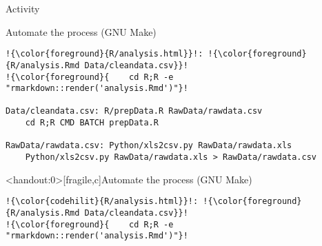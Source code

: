\documentclass[12pt,t]{beamer}
\begin{document}
{\begin{frame}[c]{Activity}

\end{frame}


\begin{frame}[fragile,c]{Automate the process (GNU Make)}

\begin{center}
\begin{minipage}[c]{10.8cm}
\begin{semiverbatim}
\begin{lstlisting}[escapechar=!,linewidth=10.8cm]
!{\color{foreground}{R/analysis.html}}!: !{\color{foreground}{R/analysis.Rmd Data/cleandata.csv}}!
!{\color{foreground}{    cd R;R -e "rmarkdown::render('analysis.Rmd')"}!

Data/cleandata.csv: R/prepData.R RawData/rawdata.csv
    cd R;R CMD BATCH prepData.R

RawData/rawdata.csv: Python/xls2csv.py RawData/rawdata.xls
    Python/xls2csv.py RawData/rawdata.xls > RawData/rawdata.csv
\end{lstlisting}
\end{semiverbatim}
\end{minipage}
\end{center}

\end{frame}


\begin{frame}<handout:0>[fragile,c]{Automate the process (GNU Make)}

\addtocounter{framenumber}{-1}

\begin{center}
\begin{minipage}[c]{10.8cm}
\begin{semiverbatim}
\begin{lstlisting}[escapechar=!,linewidth=10.8cm]
!{\color{codehilit}{R/analysis.html}}!: !{\color{foreground}{R/analysis.Rmd Data/cleandata.csv}}!
!{\color{foreground}{    cd R;R -e "rmarkdown::render('analysis.Rmd')"}!


\end{lstlisting}
\end{semiverbatim}
\end{minipage}
\end{center}
\end{frame}}
\end{document}
